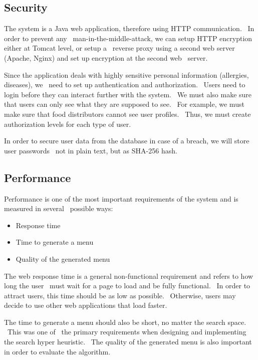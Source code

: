 \subsection{Security}
\label{subsec:specification-security}
The system is a Java web application, therefore using HTTP communication. \
In order to prevent any \
man-in-the-middle-attack, we can setup HTTP encryption either at Tomcat level, or setup a \
reverse proxy using a second web server (Apache, Nginx) and set up encryption at the second web \
server.

Since the application deals with highly sensitive personal information (allergies, diseases), we \
need to set up authentication and authorization. \
Users need to login before they can interact further with the system. \
We must also make sure that users can only see what they are supposed to see. \
For example, we must make sure that food distributors cannot see user profiles. \
Thus, we must create authorization levels for each type of user.

In order to secure user data from the database in case of a breach, we will store user passwords \
not in plain text, but as SHA-256 hash.

\subsection{Performance}
\label{subsec:specification-performance}
Performance is one of the most important requirements of the system and is measured in several \
possible ways:
\begin{itemize}
    \item Response time
    \item Time to generate a menu
    \item Quality of the generated menu
\end{itemize}

The web response time is a general non-functional requirement and refers to how long the user \
must wait for a page to load and be fully functional. \
In order to attract users, this time should be as low as possible. \
Otherwise, users may decide to use other web applications that load faster.

The time to generate a menu should also be short, no matter the search space. \
This was one of \
the primary requirements when designing and implementing the search hyper heuristic. \
The quality of the generated menu is also important in order to evaluate the algorithm.

